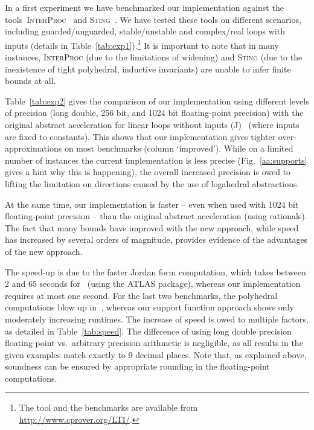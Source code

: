 \documentclass{IEEEtran}
\newcommand{\rronly}[1]{{#1}}
\begin{document}
{In a first experiment we have benchmarked our implementation against the
tools~\textsc{InterProc}~\cite{jeannet2010interproc} and
\textsc{Sting}~\cite{colon2003linear}.  
We have tested these tools on
different scenarios, including guarded/unguarded, stable/un\-stable and
complex/real loops with inputs (details in Table~\ref{tab:exp1}).\footnote{The tool and the benchmarks are available from
\url{http://www.cprover.org/LTI/}.}
It is important to note that in many instances,  \textsc{InterProc}
\rronly{(due to the limitations of widening)} and \textsc{Sting}
\rronly{(due to the inexistence of tight polyhedral, inductive invariants)}
are unable to infer finite bounds at all.

Table~\ref{tab:exp2} gives the comparison 
of our implementation using different levels of precision (long
double, 256 bit, and 1024 bit floating-point precision) with
the original abstract acceleration for linear
loops without inputs (J)~\cite{JSS14} (where inputs are fixed to
constants). 
This shows that our implementation gives tighter over-approximations on most
benchmarks (column `improved').  While on a limited number of instances the
current implementation is less precise (Fig.~\ref{aa:supports} gives a hint
why this is happening), the overall increased precision is owed to lifting
the limitation on directions caused by the use of logahedral abstractions.

At the same time, our implementation is faster -- even when used with 1024
bit floating-point precision -- than the original abstract acceleration
(using rationals).  The fact that many bounds have improved with the new
approach, while speed has increased by several orders of magnitude, provides
evidence of the advantages of the new approach.

\rronly{
The speed-up is due to the faster Jordan form computation, which takes
between 2 and 65 seconds for~\cite{JSS14} (using the ATLAS package), whereas
our implementation requires at most one second.
For the last two benchmarks, the polyhedral computations blow up
in~\cite{JSS14}, whereas our support function approach shows only moderately
increasing runtimes.  The increase of speed is owed to multiple factors, as
detailed in Table~\ref{tab:speed}.  The difference of using long double
precision floating-point vs.~arbitrary precision arithmetic is negligible,
as all results in the given examples match exactly to 9 decimal places. 
Note that, as explained above, soundness can be ensured by appropriate
rounding in the floating-point computations.

}}
\end{document}
